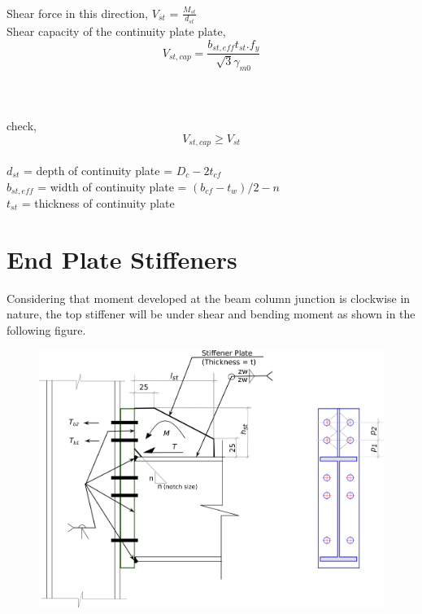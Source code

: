 \documentclass[11.5pt,a4paper,oneside]{report}
\begin{document}
\begin{Form}
\\
Shear force in this direction, $V_{st}$ = $ \frac{M_{st}}{d_{st}} $ 
\\
Shear capacity of the continuity plate plate, 
\begin{equation}
V_{st,cap} = \frac{b_{st,eff} t_{st} . f_y}{\sqrt{3} \gamma_{m0}}
\end{equation}
\indent [Reference: Cl. 8.4.1 of IS 800: 2007] \\ \\
\\
check,
\begin{equation}
V_{st,cap} \ge V_{st}
\end{equation}
\\
\indent $d_{st}$ = depth of continuity plate = $D_c - 2t_{cf}$ \\
\indent $b_{st,eff}$ = width of continuity plate = $(b_{cf} - t_w)/2 - n$ \\
\indent $t_{st}$ = thickness of continuity plate \\

\pagebreak
\section{End Plate Stiffeners}
Considering that moment developed at the beam column junction is clockwise in nature, the top stiffener will be under shear and bending moment as shown in the following figure.\\

\begin{figure}[ht]
	\centering
	\includegraphics[scale=0.5]{EPStiffeners.png}
\end{figure}




\end{Form}
\end{document}
